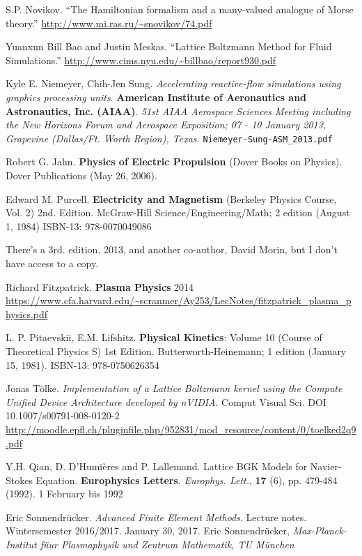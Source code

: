 \documentclass[10pt]{amsart}
\begin{document}
\begin{thebibliography}{9}
S.P. Novikov. ``The Hamiltonian formalism and a many-valued analogue of Morse theory.'' \url{http://www.mi.ras.ru/~snovikov/74.pdf}

Yuanxun Bill Bao and Justin Meskas.  ``Lattice Boltzmann Method for Fluid Simulations.''   \url{http://www.cims.nyu.edu/~billbao/report930.pdf}


Kyle E. Niemeyer, Chih-Jen Sung.  \emph{Accelerating reactive-flow simulations using graphics processing units}.  \textbf{American Institute of Aeronautics and Astronautics, Inc. (AIAA)}.  \emph{51st AIAA Aerospace Sciences Meeting including the New Horizons Forum and Aerospace Exposition; 07 - 10 January 2013, Grapevine (Dallas/Ft. Worth Region), Texas. }  \verb|Niemeyer-Sung-ASM_2013.pdf|
  

Robert G. Jahn. \textbf{Physics of Electric Propulsion} (Dover Books on Physics).  Dover Publications (May 26, 2006). 

  Edward M. Purcell. \textbf{Electricity and Magnetism} (Berkeley Physics Course, Vol. 2) 2nd. Edition.  McGraw-Hill Science/Engineering/Math; 2 edition (August 1, 1984) ISBN-13: 978-0070049086

  There's a 3rd. edition, 2013, and another co-author, David Morin, but I don't have access to a copy.  

Richard Fitzpatrick. \textbf{Plasma Physics} 2014  \url{https://www.cfa.harvard.edu/~scranmer/Ay253/LecNotes/fitzpatrick_plasma_physics.pdf}

L. P. Pitaevskii, E.M. Lifshitz. \textbf{Physical Kinetics}: Volume 10 (Course of Theoretical Physics S) 1st Edition.  Butterworth-Heinemann; 1 edition (January 15, 1981).  ISBN-13: 978-0750626354

  Jonas T\"{o}lke.  \emph{Implementation of a Lattice Boltzmann kernel using the Compute Unified Device Architecture developed by nVIDIA}.  Comput Visual Sci.  DOI 10.1007/s00791-008-0120-2  \url{http://moodle.epfl.ch/pluginfile.php/952831/mod_resource/content/0/toelked2q9.pdf}

Y.H. Qian, D. D'Humi\`{e}res and P. Lallemand.  Lattice BGK Models for Navier-Stokes Equation.  \textbf{Europhysics Letters}.  \emph{Europhys. Lett.}, \textbf{17} (6), pp. 479-484 (1992).  1 February bis 1992 
 

Eric Sonnendr\"{u}cker.  \emph{Advanced Finite Element Methods}.  Lecture notes.  Wintersemester 2016/2017.  January 30, 2017.  Eric Sonnendr\"{u}cker, \emph{Max-Planck-Institut f\"{u}ur Plasmaphysik und Zentrum Mathematik, TU M\"{u}nchen}


\end{thebibliography}
\end{document}
